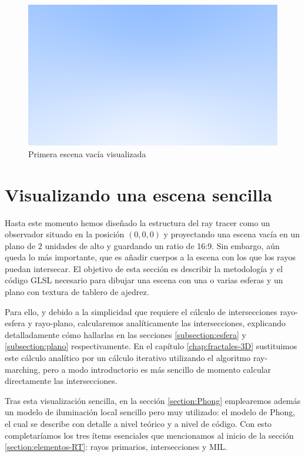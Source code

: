 \begin{figure} [ht]
    \centering
    \includegraphics[scale = 0.35]{img/C7/first-render.png}
    \caption{Primera escena vacía visualizada}
    \label{fig:first-render}
\end{figure}

\section{Visualizando una escena sencilla}
\label{section:escena}

Hasta este momento hemos diseñado la estructura del ray tracer como un observador situado en la posición $(0, 0,0)$ y proyectando una escena vacía en un plano de $2$ unidades de alto y guardando un ratio de 16:9. Sin embargo, aún queda lo más importante, que es añadir cuerpos a la escena con los que los rayos puedan intersecar. El objetivo de esta sección es describir la metodología y el código GLSL necesario para dibujar una escena con una o varias esferas y un plano con textura de tablero de ajedrez. 

Para ello, y debido a la simplicidad que requiere el cálculo de intersecciones rayo-esfera y rayo-plano, calcularemos analíticamente las intersecciones, explicando detalladamente cómo hallarlas en las secciones \ref{subsection:esfera} y \ref{subsection:plano} respectivamente. En el capítulo \ref{chap:fractales-3D} sustituimos este cálculo analítico por un cálculo iterativo utilizando el algoritmo ray-marching, pero a modo introductorio es más sencillo de momento calcular directamente las intersecciones.

Tras esta visualización sencilla, en la sección \ref{section:Phong} emplearemos además un modelo de iluminación local sencillo pero muy utilizado: el modelo de Phong, el cual se describe con detalle a nivel teórico y a nivel de código. Con esto completaríamos los tres ítems esenciales que mencionamos al inicio de la sección \ref{section:elementos-RT}: rayos primarios, intersecciones y MIL.

